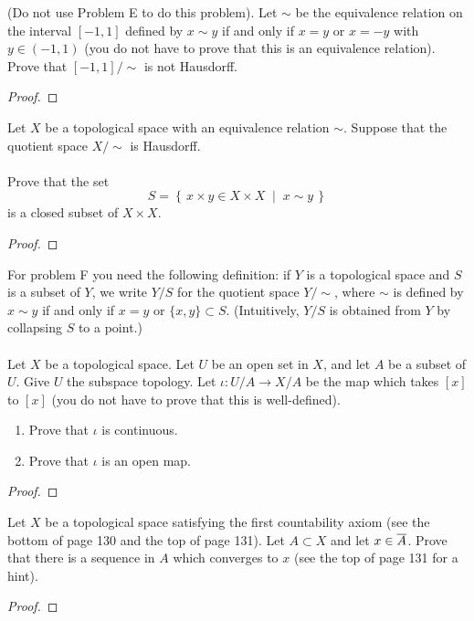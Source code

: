 \newpage
\begin{problem}[D]
(Do not use Problem E to do this problem). Let $\sim$ be the
equivalence relation on the interval $[-1,1]$ defined by $x\sim
y$ if and only if $x=y$ or $x=-y$ with $y\in(-1,1)$ (you do not
have to prove that this is an equivalence relation). Prove that
$[-1,1]/{\sim}$ is not Hausdorff.
\end{problem}
\begin{proof}
\end{proof}
\newpage
\begin{problem}[E]
Let $X$ be a topological space with an equivalence relation
$\sim$. Suppose that the quotient space $X/\sim$ is Hausdorff.
\\\\
Prove that the set
\[
S=\left\{\,x\times y\in X\times X\;\middle|\;x\sim y\,\right\}
\]
is a closed subset of $X\times X$.
\end{problem}
\begin{proof}
\end{proof}
\newpage
\begin{problem}[F]
For problem F you need the following definition: if $Y$ is a
topological space and $S$ is a subset of $Y$, we write $Y/S$ for
the quotient space $Y/{\sim}$, where $\sim$ is defined by $x\sim y$
if and only if $x=y$ or $\{x,y\}\subset S$. (Intuitively, $Y/S$
is obtained from $Y$ by collapsing $S$ to a point.)
\\\\
Let $X$ be a topological space. Let $U$ be an open set in $X$,
and let $A$ be a subset of $U$. Give $U$ the subspace
topology. Let $\iota\colon U/A\to X/A$ be the map which takes
$[x]$ to $[x]$ (you do not have to prove that this is
well-defined).
\begin{enumerate}[noitemsep,label=(\roman*)]
\item Prove that $\iota$ is continuous.
\item Prove that $\iota$ is an open map.
\end{enumerate}
\end{problem}
\begin{proof}
\end{proof}
\newpage
\begin{problem}[G]
Let $X$ be a topological space satisfying the first countability
axiom (see the bottom of page 130 and the top of page 131). Let
$A\subset X$ and let $x\in\overline{A}$. Prove that there is a
sequence in $A$ which converges to $x$ (see the top of page 131
for a hint).
\end{problem}
\begin{proof}
\end{proof}


